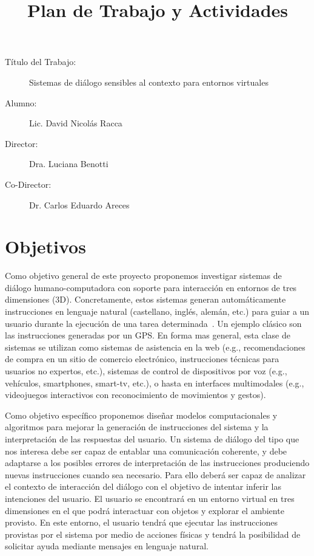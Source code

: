 \documentclass[10.9pt,a4paper]{article}
\title{Plan de Trabajo y Actividades}
\date{}
\begin{document}
\maketitle

\begin{description}
	\item [T\'itulo del Trabajo:] Sistemas de di\'alogo sensibles al contexto para entornos virtuales
	\item [Alumno:] Lic. David Nicol\'as Racca
	\item [Director:] Dra. Luciana Benotti
	\item [Co-Director:] Dr. Carlos Eduardo Areces
\end{description}



\section{Objetivos}

Como objetivo general de este proyecto proponemos investigar 
sistemas de di\'alogo humano-computadora con soporte para interacci\'on 
en entornos de tres dimensiones (3D). Concretamente, estos sistemas 
generan autom\'aticamente instrucciones en lenguaje natural (castellano, 
ingl\'es, alem\'an, etc.) para guiar a un usuario durante la 
ejecuci\'on de una tarea determinada~\citep{arec:dial10}. Un ejemplo
cl\'asico son las instrucciones generadas por un GPS. En forma mas general,
esta clase de sistemas se utilizan como sistemas de asistencia en la 
web (e.g., recomendaciones de compra en un sitio de comercio electr\'onico,
instrucciones t\'ecnicas para usuarios no expertos, etc.), sistemas de control 
de dispositivos por voz (e.g., veh\'iculos, smartphones, smart-tv, etc.), o 
hasta en interfaces multimodales (e.g., videojuegos interactivos con reconocimiento 
de movimientos y gestos).

Como objetivo espec\'ifico proponemos dise\~nar modelos 
computacionales y algoritmos para mejorar la generaci\'on de 
instrucciones del sistema y la interpretaci\'on de las respuestas del 
usuario. 
Un sistema de di\'alogo del tipo que nos interesa 
debe ser capaz de entablar una comunicaci\'on coherente, y debe 
adaptarse a los posibles errores de interpretaci\'on de las instrucciones 
produciendo nuevas instrucciones cuando sea necesario. Para ello deber\'a 
ser capaz de analizar el contexto de interacci\'on del di\'alogo con el 
objetivo de intentar inferir las intenciones del usuario.
El usuario se encontrar\'a en un entorno virtual en tres dimensiones
en el que podr\'a interactuar con objetos y explorar el ambiente provisto. 
En este entorno, el usuario tendr\'a que ejecutar las instrucciones 
provistas por el sistema por medio de acciones f\'isicas y tendr\'a la 
posibilidad de solicitar ayuda mediante mensajes en lenguaje natural.
\end{document}
